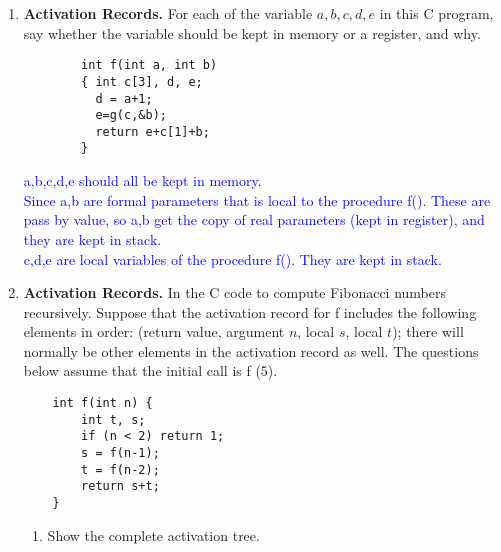 \documentclass[10pt]{article}
\begin{document}
\begin{enumerate}
  \item \textbf{Activation Records. } For each of the variable $a, b, c, d, e$ in this C program, say whether
        the variable should be kept in memory or a register, and why.
        \begin{verbatim}
        int f(int a, int b)
        { int c[3], d, e;
          d = a+1;
          e=g(c,&b);
          return e+c[1]+b;
        }
        \end{verbatim}
        \textcolor{blue}{
          a,b,c,d,e should all be kept in memory. \\Since a,b are formal parameters that is local to the procedure f(). These are pass by value, so a,b get the copy of real parameters (kept in register), and they are kept in stack.\\
          c,d,e are local variables of the procedure f(). They are kept in stack.
        }
  \item \textbf{Activation Records. } In the C code to compute Fibonacci numbers recursively. Suppose that the
        activation record for f includes the following elements
        in order: (return value, argument $n$, local $s$, local $t$); there will normally be
        other elements in the activation record as well. The questions below assume
        that the initial call is f (5).
        \begin{verbatim}
    int f(int n) {
        int t, s;
        if (n < 2) return 1;
        s = f(n-1);
        t = f(n-2);
        return s+t;
    }
    \end{verbatim}
        \begin{enumerate}
          \item Show the complete activation tree.
                \textcolor{blue}{\\
                  }
\end{enumerate}
\end{enumerate}
\end{document}
